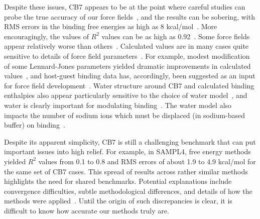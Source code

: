 \documentclass[aps,pre,twocolumn,nofootinbib,superscriptaddress,10pt, final,tightenlines]{revtex4-1}
\begin{document}
Despite these issues, CB7 appears to be at the point where careful studies can probe the true accuracy of our force fields~\cite{henriksen_computational_2015, gao_binding_2015, yin_toward_2015}, and the results can be sobering, with RMS errors in the binding free energies as high as 8 kcal/mol~\cite{henriksen_computational_2015, monroe_converging_2014}. More encouragingly, the values of $R^2$ values can be as high as 0.92~\cite{henriksen_computational_2015}. 
Some force fields appear relatively worse than others~\cite{hsiao_prediction_2014, muddana_prediction_2012}.
Calculated values are in many cases quite sensitive to details of force field parameters~\cite{monroe_converging_2014, moghaddam_new_2011, muddana_prediction_2012}. For example, modest modification of some Lennard-Jones parameters yielded dramatic improvements in calculated values~\cite{yin_toward_2015}, and host-guest binding data has, accordingly, been suggested as an input for force field development~\cite{yin_toward_2015, henriksen_computational_2015, gao_binding_2015}.
Water structure around CB7 and calculated binding enthalpies also appear particularly sensitive to the choice of water model~\cite{rogers_role_2013, fenley_bridging_2014, gao_binding_2015}, and water is clearly important for modulating binding~\cite{nguyen_grid_2012}.
The water model also impacts the number of sodium ions which must be displaced (in sodium-based buffer) on binding~\cite{gao_binding_2015, henriksen_computational_2015}.

Despite its apparent simplicity, CB7 is still a challenging benchmark that can put important issues into high relief. For example, in SAMPL4, free energy methods yielded $R^2$ values from 0.1 to 0.8 and RMS errors of about 1.9 to 4.9 kcal/mol for the same set of CB7 cases. This spread of results across rather similar methods highlights the need for shared benchmarks. Potential explanations include convergence difficulties, subtle methodological differences, and details of how the methods were applied~\cite{muddana_sampl4_2014}. Until the origin of such discrepancies is clear, it is difficult to know how accurate our methods truly are. 

\end{document}
